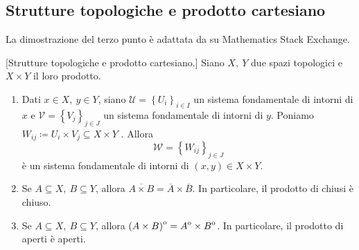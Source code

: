 \subsection{Strutture topologiche e prodotto cartesiano}
La dimostrazione del terzo punto è adattata da \cite{Math1000:interior} su Mathematics Stack Exchange.
\begin{proposition}{}[Strutture topologiche e prodotto cartesiano.]\label{topologiaprodottostruttura}
	Siano $X,\ Y$ due spazi topologici e $X\times Y$ il loro prodotto.
	\begin{enumerate}
		\item Dati $x\in X,\ y\in Y$, siano $\mathcal{U} = \left\{U_i\right\}_{i\in I}$ un
		sistema fondamentale di intorni di $x$ e $\mathcal{V} = \left\{V_j\right\}_{j\in J}$ un sistema fondamentale di intorni di $y$. Poniamo $W_{ij} \coloneqq U_i \times V_j \subseteq X \times Y$ . Allora
		\begin{equation*}
			\mathcal{W} = \left\{W_{ij}\right\}_{j\in J}
		\end{equation*}
		è un sistema fondamentale di intorni di $(x,y) \in X \times Y$.
		\item Se $A\subseteq X,\ B\subseteq Y$, allora $\overline{A\times B}=\overline{A}\times \overline{B}$. In particolare, il prodotto di chiusi è chiuso.
		\item Se $A\subseteq X,\ B\subseteq Y$, allora ${\kern0pt\left(A\times B\right)}^{\mathrm{o}}={\kern0ptA}^{\mathrm{o}}\times {\kern0ptB}^{\mathrm{o}}$. In particolare, il prodotto di aperti è aperti.
	\end{enumerate}
\end{proposition}

